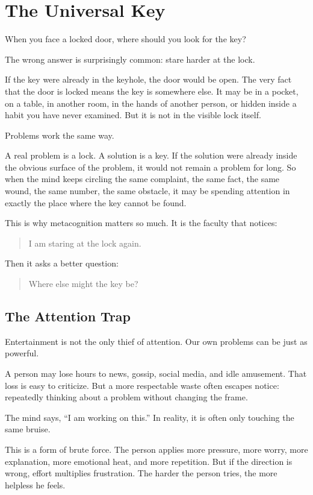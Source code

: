 \chapter{The Universal Key}

When you face a locked door, where should you look for the key?

The wrong answer is surprisingly common: stare harder at the lock.

If the key were already in the keyhole, the door would be open. The very fact that the door is locked means the key is somewhere else. It may be in a pocket, on a table, in another room, in the hands of another person, or hidden inside a habit you have never examined. But it is not in the visible lock itself.

Problems work the same way.

A real problem is a lock. A solution is a key. If the solution were already inside the obvious surface of the problem, it would not remain a problem for long. So when the mind keeps circling the same complaint, the same fact, the same wound, the same number, the same obstacle, it may be spending attention in exactly the place where the key cannot be found.

This is why metacognition matters so much. It is the faculty that notices:

\begin{quote}
I am staring at the lock again.
\end{quote}

Then it asks a better question:

\begin{quote}
Where else might the key be?
\end{quote}

\section*{The Attention Trap}

Entertainment is not the only thief of attention. Our own problems can be just as powerful.

A person may lose hours to news, gossip, social media, and idle amusement. That loss is easy to criticize. But a more respectable waste often escapes notice: repeatedly thinking about a problem without changing the frame.

The mind says, ``I am working on this.'' In reality, it is often only touching the same bruise.

This is a form of brute force. The person applies more pressure, more worry, more explanation, more emotional heat, and more repetition. But if the direction is wrong, effort multiplies frustration. The harder the person tries, the more helpless he feels.

